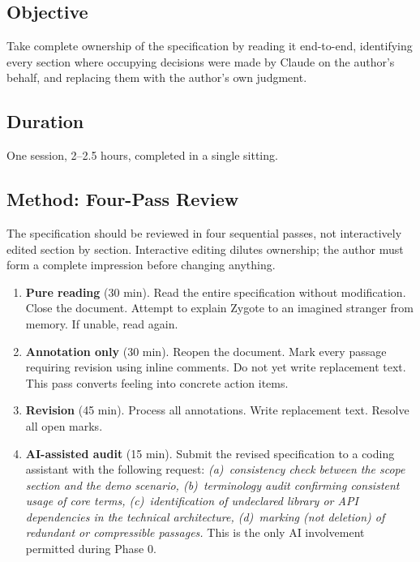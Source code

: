 \documentclass[11pt,letterpaper]{article}
\begin{document}
\subsection*{Objective}
Take complete ownership of the specification by reading it end-to-end, identifying every section where occupying decisions were made by Claude on the author's behalf, and replacing them with the author's own judgment.

\subsection*{Duration} One session, 2--2.5 hours, completed in a single sitting.

\subsection*{Method: Four-Pass Review}

The specification should be reviewed in four sequential passes, not interactively edited section by section. Interactive editing dilutes ownership; the author must form a complete impression before changing anything.

\begin{enumerate}
  \item \textbf{Pure reading} (30 min). Read the entire specification without modification. Close the document. Attempt to explain Zygote to an imagined stranger from memory. If unable, read again.

  \item \textbf{Annotation only} (30 min). Reopen the document. Mark every passage requiring revision using inline comments. Do not yet write replacement text. This pass converts feeling into concrete action items.

  \item \textbf{Revision} (45 min). Process all annotations. Write replacement text. Resolve all open marks.

  \item \textbf{AI-assisted audit} (15 min). Submit the revised specification to a coding assistant with the following request: \textit{(a)~consistency check between the scope section and the demo scenario, (b)~terminology audit confirming consistent usage of core terms, (c)~identification of undeclared library or API dependencies in the technical architecture, (d)~marking (not deletion) of redundant or compressible passages.} This is the only AI involvement permitted during Phase 0.
\end{enumerate}
\end{document}
